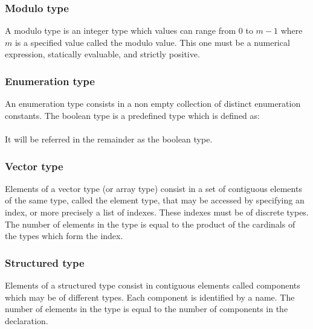 \rangetypedef


\subsubsection{Modulo type}
A modulo type is an integer type which values can range from $0$ to
$m-1$ where $m$ is a specified value called the modulo value.  This
one must be a numerical expression, statically evaluable, and strictly
positive.\\

\modulotypedef


\subsubsection{Enumeration type}
An enumeration type consists in a non empty collection of distinct
enumeration constants.  The boolean type  is a predefined
type which is defined as:\\
\\
It will be referred in the remainder as the boolean type.\\

\enumerationtypedef


\subsubsection{Vector type}
Elements of a vector type (or array type) consist in a set of
contiguous elements of the same type, called the element type, that
may be accessed by specifying an index, or more precisely a list of
indexes.  These indexes must be of discrete types.  The number of
elements in the type is equal to the product of the cardinals of the
types which form the index.\\

\vectortypedef


\subsubsection{Structured type}
Elements of a structured type consist in contiguous elements called
components which may be of different types.  Each component is
identified by a name.  The number of elements in the type is equal to
the number of components in the declaration.\\

\structuredtypedef


